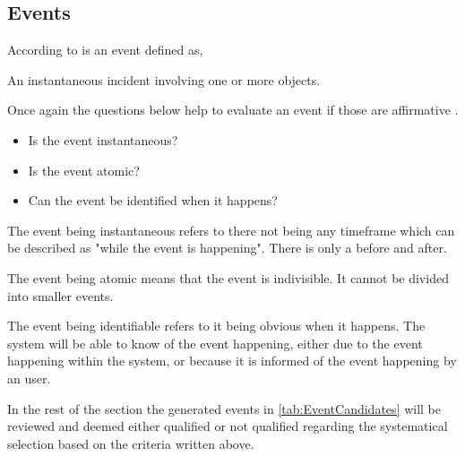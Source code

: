 \subsection{Events} \label{sec:Events}
According to \citep[p.~53]{Rod-Aalborg} is an event defined as,
\begin{defn}\label{defn:Event}
An instantaneous incident involving one or more objects.
\end{defn}
Once again the questions below help to evaluate an event if those are affirmative \citep[p.~65]{Rod-Aalborg}.
\begin{itemize}
	\item Is the event instantaneous?
	\item Is the event atomic?
	\item Can the event be identified when it happens?
\end{itemize}

The event being instantaneous refers to there not being any timeframe which can be described as "while the event is happening". There is only a before and after.

The event being atomic means that the event is indivisible. It cannot be divided into smaller events.

The event being identifiable refers to it being obvious when it happens. The system will be able to know of the event happening, either due to the event happening within the system, or because it is informed of the event happening by an user.

In the rest of the section the generated events in \cref{tab:EventCandidates} will be reviewed and deemed either qualified or not qualified regarding the systematical selection based on the criteria written above.

